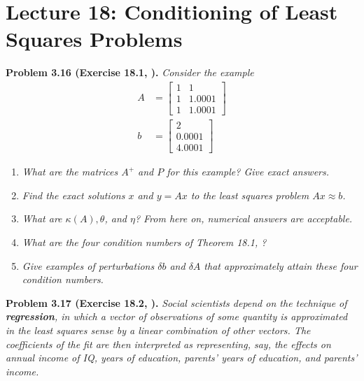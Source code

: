 \documentclass[a4paper,oneside]{book}
\numberwithin{equation}{chapter}
\begin{document}
\section{Lecture 18: Conditioning of Least Squares Problems}
\textbf{Problem 3.16 (Exercise 18.1, \cite{1}).} \textit{Consider the example}
\begin{align}
A& = \left[ {\begin{array}{*{20}{c}}
1&1\\
1&{1.0001}\\
1&{1.0001}
\end{array}} \right]\\
b& = \left[ {\begin{array}{*{20}{c}}
2\\
{0.0001}\\
{4.0001}
\end{array}} \right]
\end{align}
\begin{enumerate}
\item \textit{What are the matrices $A^+$ and $P$ for this example? Give exact answers.}
\item \textit{Find the exact solutions $x$ and $y=Ax$ to the least squares problem $Ax\approx b$.}
\item \textit{What are $\kappa \left(A\right),\theta$, and $\eta$? From here on, numerical answers are acceptable.}
\item \textit{What are the four condition numbers of Theorem 18.1, \cite{1}?}
\item \textit{Give examples of perturbations $\delta b$ and $\delta A$ that approximately attain these four condition numbers.}
\end{enumerate}
\textbf{Problem 3.17 (Exercise 18.2, \cite{1}).} \textit{Social scientists depend on the technique of \textbf{regression}, in which a vector of observations of some quantity is approximated in the least squares sense by a linear combination of other vectors. The coefficients of the fit are then interpreted as representing, say, the effects on annual income of IQ, years of education, parents' years of education, and parents' income.}
\end{document}
